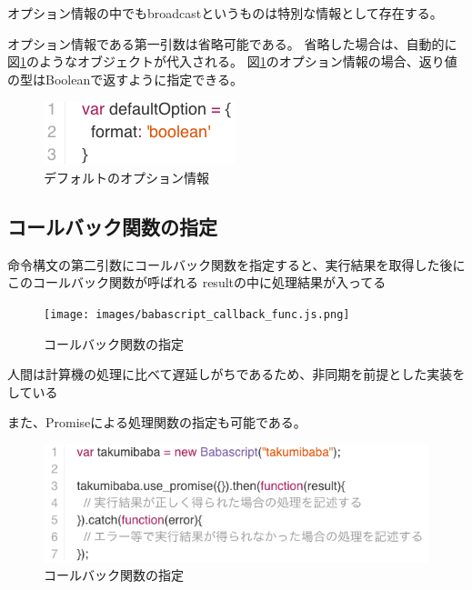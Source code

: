 オプション情報の中でもbroadcastというものは特別な情報として存在する。

オプション情報である第一引数は省略可能である。
省略した場合は、自動的に図\ref{fig:option_default}のようなオブジェクトが代入される。
図\ref{fig:option_default}のオプション情報の場合、返り値の型はBooleanで返すように指定できる。

\begin{figure}[htbp]
  \begin{center}
  \includegraphics[width=.4\linewidth,bb=0 0 210 70]{images/option_default.js.png}
  \end{center}
  \caption{デフォルトのオプション情報}
  \label{fig:option_default}
\end{figure}

\subsection{コールバック関数の指定}\label{ux30b3ux30fcux30ebux30d0ux30c3ux30afux95a2ux6570ux306eux6307ux5b9a}

命令構文の第二引数にコールバック関数を指定すると、実行結果を取得した後にこのコールバック関数が呼ばれる
resultの中に処理結果が入ってる

\begin{figure}[htbp]
  \begin{center}
  \texttt{[image: images/babascript\_callback\_func.js.png]}
  \end{center}
  \caption{コールバック関数の指定}
  \label{fig:babascript_callback_func}
\end{figure}

人間は計算機の処理に比べて遅延しがちであるため、非同期を前提とした実装をしている

また、Promiseによる処理関数の指定も可能である。

\begin{figure}[htbp]
  \begin{center}
  \includegraphics[width=.5\linewidth,bb=0 0 574 513]{images/babascript_promise.js.png}
  \end{center}
  \caption{コールバック関数の指定}
  \label{fig:babascript_promise}
\end{figure}

